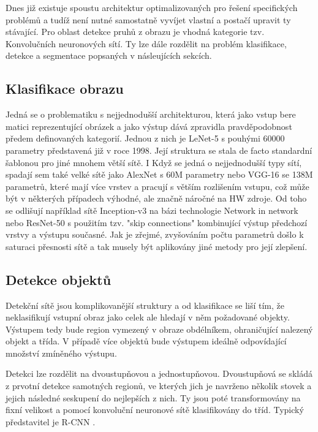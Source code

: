 \documentclass[czech, bc, kky, he, iso690numb]{fasthesis}
\begin{document}
           	Dnes již existuje spoustu architektur optimalizovaných pro řešení specifických problémů a tudíž není nutné samostatně vyvíjet vlastní a postačí upravit ty stávající. Pro oblast detekce pruhů z obrazu je vhodná kategorie tzv. Konvolučních neuronových sítí. Ty lze dále rozdělit na problém klasifikace, detekce a segmentace popsaných v násleujících sekcích.
           	
           	\subsection{Klasifikace obrazu} \label{subsec:klasifikace_obrazu}
           		Jedná se o problematiku s nejjednodušší architekturou, která jako vstup bere matici reprezentující obrázek a jako výstup dává zpravidla pravděpodobnost předem definovaných kategorií. Jednou z nich je LeNet-5 \cite{LeNet-5} s pouhými 60000 parametry představená již v roce 1998. Její struktura se stala de facto standardní šablonou pro jiné mnohem větší sítě. I Když se jedná o nejjednodušší typy sítí, spadají sem také velké sítě jako AlexNet \cite{ImageNet} s 60M parametry nebo VGG-16 \cite{VGG-16} se 138M parametrů, které mají více vrstev a pracují s větším rozlišením vstupu, což může být v některých případech výhodné, ale značně náročné na HW zdroje. Od toho se odlišují například sítě Inception-v3 \cite{Inception-v3} na bázi technologie Network in network \cite{Network_in_network} nebo ResNet-50 \cite{ResNet-50} s použitím tzv. "skip connections"  kombinující výstup předchozí vrstvy a výstupu současné. Jak je zřejmé, zvyšováním počtu parametrů došlo k saturaci přesnosti sítě a tak musely být aplikovány jiné metody pro její zlepšení.
           	
           	\subsection{Detekce objektů}\label{subsec:detekce_objektu}
           		Detekční sítě jsou komplikovanější struktury a od klasifikace se liší tím, že neklasifikují vstupní obraz jako celek ale hledají v něm požadované objekty. Výstupem tedy bude region vymezený v obraze obdélníkem, ohraničující nalezený objekt a třída. V případě více objektů bude výstupem ideálně odpovídající množství zmíněného výstupu.
           		
           		Detekci lze rozdělit na dvoustupňovou a jednostupňovou. Dvoustupňová se skládá z prvotní detekce samotných regionů, ve kterých jich je navrženo několik stovek a jejich následné seskupení do nejlepších z nich. Ty jsou poté transformovány na fixní velikost a pomocí konvoluční neuronové sítě klasifikovány do tříd. Typický představitel je R-CNN \cite{R-CNN}.
           		
\end{document}
